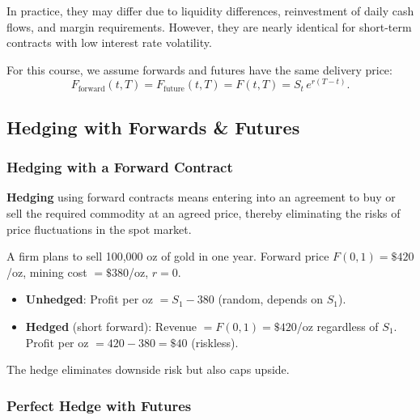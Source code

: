 \begin{sidenote}
  In practice, they may differ due to liquidity differences, reinvestment of daily cash flows, and margin requirements. However, they are nearly identical for short-term contracts with low interest rate volatility.
\end{sidenote}

\begin{sidenote}
  For this course, we assume forwards and futures have the same delivery price:
  \[
    F_{\text{forward}}(t,T) = F_{\text{future}}(t,T) = F(t,T) = S_t\,e^{r(T-t)}.
  \]
\end{sidenote}

\subsection{Hedging with Forwards \& Futures}

\subsubsection{Hedging with a Forward Contract}

\begin{definition}[Hedging]
  \textbf{Hedging} using forward contracts means entering into an agreement to buy or sell the required commodity at an agreed price, thereby eliminating the risks of price fluctuations in the spot market.
\end{definition}

\begin{example}
  A firm plans to sell 100{,}000 oz of gold in one year. Forward price $F(0,1) = \$420$/oz, mining cost $= \$380$/oz, $r=0$.

  \begin{itemize}
    \item \textbf{Unhedged}: Profit per oz $= S_1 - 380$ (random, depends on $S_1$).
    \item \textbf{Hedged} (short forward): Revenue $= F(0,1) = \$420$/oz regardless of $S_1$.
    Profit per oz $= 420 - 380 = \$40$ (riskless).
  \end{itemize}

  The hedge eliminates downside risk but also caps upside.
\end{example}

\subsubsection{Perfect Hedge with Futures}

